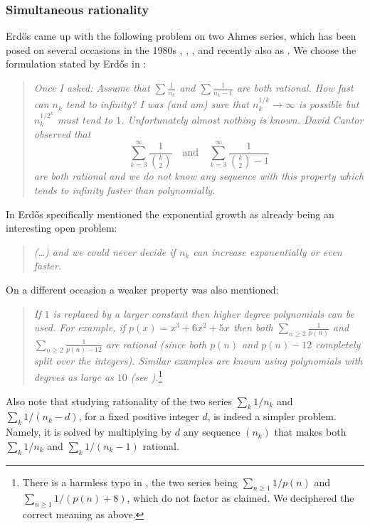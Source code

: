 \documentclass[11pt,letterpaper,reqno]{amsart}
\numberwithin{equation}{section}
\theoremstyle{definition}
\numberwithin{equation}{section}
\begin{document}
\subsubsection{Simultaneous rationality}
Erd\H{o}s came up with the following problem on two Ahmes series, which has been posed on several occasions in the 1980s \cite[p.~64]{EG80}, \cite[p.~334]{Erd85}, \cite[p.~104]{Erd88}, and recently also as \cite[Problem \#265]{EP}. We choose the formulation stated by Erd\H{o}s in \cite{Erd88}:
\begin{quote}
\emph{Once I asked: Assume that $\sum \frac{1}{n_k}$ and $\sum \frac{1}{n_k-1}$ are both rational. How fast can $n_k$ tend to infinity? I was (and am) sure that $n_k^{1/k}\to\infty$ is possible but $n_k^{1/2^k}$ must tend to $1$. Unfortunately almost nothing is known. David Cantor observed that
\begin{equation}\label{eq:DCantorex}
\sum_{k=3}^{\infty} \frac{1}{\binom{k}{2}} \quad\text{and}\quad \sum_{k=3}^{\infty} \frac{1}{\binom{k}{2}-1}
\end{equation}
are both rational and we do not know any sequence with this property which tends to infinity faster than polynomially.}
\end{quote}
In \cite[p.~334]{Erd85} Erd\H{o}s specifically mentioned the exponential growth as already being an interesting open problem:
\begin{quote}
\emph{(\ldots) and we could never decide if $n_k$ can increase exponentially or even faster.}
\end{quote}
On a different occasion \cite[p.~64]{EG80} a weaker property was also mentioned:
\begin{quote}
\emph{If $1$ is replaced by a larger constant then higher degree polynomials can be used. For example, if $p(x)=x^3+6x^2+5x$ then both $\sum_{n\geqslant 2}\frac{1}{p(n)}$ and $\sum_{n\geqslant 2}\frac{1}{p(n)-12}$ are rational (since both $p(n)$ and $p(n)-12$ completely split over the integers). Similar examples are known using polynomials with degrees as large as $10$ (see \cite{HW54}).}\footnote{There is a harmless typo in \cite{EG80}, the two series being $\sum_{n\geqslant 1}1/p(n)$ and $\sum_{n\geqslant 1}1/(p(n)+8)$, which do not factor as claimed. We deciphered the correct meaning as above.}
\end{quote}
Also note that studying rationality of the two series $\sum_k 1/n_k$ and $\sum_k 1/(n_k-d)$, for a fixed positive integer $d$, is indeed a simpler problem. Namely, it is solved by multiplying by $d$ any sequence $(n_k)$ that makes both $\sum_k 1/n_k$ and $\sum_k 1/(n_k-1)$ rational.
\end{document}

